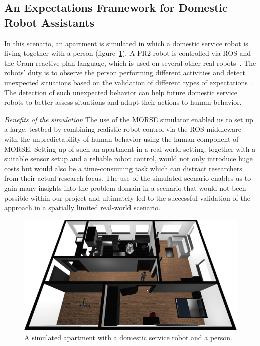 \documentclass[letterpaper, 10pt, conference]{ieeeconf}
\begin{document}
\subsection{An Expectations Framework for Domestic Robot Assistants}
\label{sc:expectations}

In this scenario, an apartment is simulated in which a domestic 
service robot is living together with a person (figure~\ref{fig|apartment}). 
A PR2 robot is controlled via ROS and the {\sc Cram} reactive plan language, 
which is used on several other real robots~\cite{pancakes11humanoids}. The robots' 
duty is to observe the person performing different activities and detect unexpected 
situations based on the validation of different types of expectations~\cite{Karg2013}. 
The detection of such unexpected behavior can help future domestic service robots 
to better assess situations and adapt their actions to human behavior.

\emph{Benefits of the simulation} The use of the MORSE simulator enabled us to set up a large, 
testbed by combining realistic robot control via the ROS middleware with the
unpredictability of human behavior using the human component of MORSE. Setting
up of such an apartment in a real-world setting, together with a suitable
sensor setup and a reliable robot control, would not only introduce huge costs
but would also be a time-consuming task which can distract researchers from
their actual research focus. The use of the simulated scenario enables us to
gain many insights into the problem domain in a scenario that would not been
possible within our project and ultimately led to the successful validation of
the approach in a spatially limited real-world scenario.

\begin{figure}[H]
      \centering
      \includegraphics[width=0.9\linewidth]{morse_apartment.png}
      \caption{A simulated apartment with a domestic service robot and a person.}
      \label{fig|apartment}
\end{figure}
\end{document}
